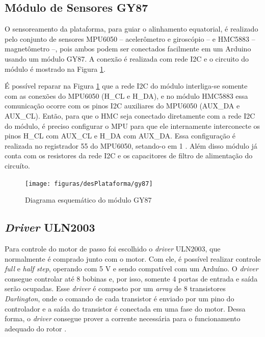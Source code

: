 \subsection{Módulo de Sensores GY87}
O sensoreamento da plataforma, para guiar o alinhamento equatorial, é realizado pelo conjunto de sensores MPU6050 -- acelerômetro e giroscópio -- e HMC5883 -- magnetômetro --, pois ambos podem ser conectados facilmente em um Arduino usando um módulo GY87. A conexão é realizada com rede I2C e o circuito do módulo é mostrado na Figura \ref{fig:gy87}.

É possível reparar na Figura \ref{fig:gy87} que a rede I2C do módulo interliga-se somente com as conexões do MPU6050 (H\_CL e H\_DA), e no módulo HMC5883 essa comunicação ocorre com os pinos I2C auxiliares do MPU6050 (AUX\_DA e AUX\_CL). Então, para que o HMC seja conectado diretamente com a rede I2C do módulo, é preciso configurar o MPU para que ele internamente interconecte os pinos H\_CL com AUX\_CL e H\_DA com AUX\_DA.  Essa configuração é realizada no registrador 55 do MPU6050, setando-o em 1 \cite{man:mpu6050}. Além disso módulo já conta com os resistores da rede I2C e os capacitores de filtro de alimentação do circuíto.

\begin{figure}[!htb]
	\centering
	\caption{Diagrama esquemático do módulo GY87}
	\texttt{[image: figuras/desPlataforma/gy87]}
	\label{fig:gy87}
\end{figure}

\subsection{\textit{Driver} ULN2003}
Para controle do motor de passo foi escolhido o \textit{driver} ULN2003, que normalmente é comprado junto com o motor. Com ele, é possível realizar controle \textit{full} e \textit{half step}, operando com 5 V e sendo compatível com um Arduíno. O \textit{driver} consegue controlar até 8 bobinas e, por isso, somente 4 portas de entrada e saída serão ocupadas. Esse \textit{driver} é composto por um \textit{array} de 8 transistores \textit{Darlington}, onde o comando de cada transistor é enviado por um pino do controlador e a saída do transistor é conectada em uma fase do motor. Dessa forma, o \textit{driver} consegue prover a corrente necessária para o funcionamento adequado do rotor \cite{man:ulndriver}.

